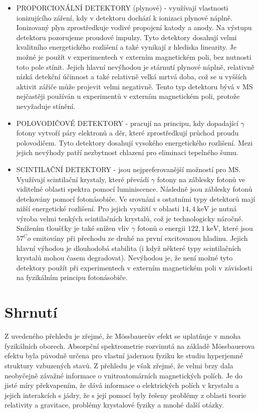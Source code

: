 \documentclass[../../main.tex]{subfiles}
\begin{document}
\begin{itemize}
	\item PROPORCIONÁLNÍ DETEKTORY (plynové) - využívají vlastnosti ionizujícího záření, kdy
	v detektoru dochází k ionizaci plynové náplně. Ionizovaný plyn zprostředkuje vodivé propojení katody a anody. Na výstupu detektoru pozorujeme proudové impulzy. Tyto detektory dosahují velmi kvalitního energetického rozlišení a také vynikají z hlediska linearity. Je možné je použít v experimentech v externím magnetickém poli, bez nutnosti toto pole stínit. Jejich hlavní nevýhodou je stárnutí plynové náplně, relativně nízká detekční účinnost a také relativně velká mrtvá doba, což se u vyšších aktivit zářiče může projevit velmi negativně. Tento typ detektoru bývá v MS nejčastěji používán u experimentů v externím magnetickém poli, protože nevyžaduje stínění.
	\item POLOVODIČOVÉ DETEKTORY - pracují na principu, kdy dopadající $\gamma$ fotony vytvoří páry elektronů a děr, které zprostředkují průchod proudu polovodičem. Tyto detektory dosahují vysokého energetického rozlišení. Mezi jejich nevýhody patří nezbytnost chlazení pro eliminaci tepelného šumu.
	\item SCINTILAČNÍ DETEKTORY - jsou nejpreferovanější možností pro MS. Využívají scintilační krystaly, které převádí $\gamma$ fotony na záblesky fotonů ve viditelné oblasti spektra pomocí luminiscence. Následně jsou záblesky fotonů detekovány pomocí fotonásobiče. Ve srovnání s ostatními typy detektorů mají nižší energetické rozlišení. Pro jejich využití v oblasti $14,4 ~\mathrm{keV}$ je nutná výroba velmi tenkých scintilačních krystalů, což je technologicky náročné. Snížením tloušťky je také snížen vliv $\gamma$ fotonů o energii $122,1 ~\mathrm{keV}$, které jsou ${57}^Co$ emitovány při přechodu ze druhé na první excitovanou hladinu. Jejich hlavní výhodou je dlouhodobá stabilita (i když některé typy scintilačních krystalů mohou časem degradovat). Nevýhodou je, že není možné tyto detektory použít při experimentech v externím magnetickém poli v závislosti na fyzikálním principu fotonásobiče. 
\end{itemize}

\section{Shrnutí}

Z uvedeného přehledu je zřejmé, že Mössbauerův efekt se uplatňuje v mnoha fyzikálních oborech. Absorpční spektrometrie rozvinutá na základě Mössbauerova efektu byla původně určena pro vlastní jadernou fyziku ke studiu hyperjemné struktury vzbuzených stavů. Z přehledu je však zřejmé, že velmi brzy dala neobyčejně závažné informace o vnitroatomárních magnetických polích. Je do jisté míry překvapením, že dává informace o elektrických polích v krystalu a jejich interakcích s jádry, že s její pomocí byly řešeny problémy z oblasti teorie relativity a gravitace, problémy krystalové fyziky a mnohé další otázky. 
\end{document}
